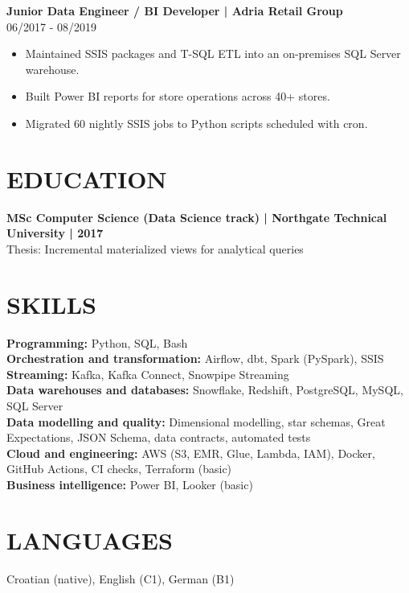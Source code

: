 \documentclass[11pt,a4paper]{article}
\newcommand{\cvsection}[1]{\section*{#1}}
\newcommand{\cvrole}[2]{\par\addvspace{0.5em}\noindent\textbf{#1}\\#2\par\nopagebreak}
\begin{document}
\cvrole{Junior Data Engineer / BI Developer | Adria Retail Group}{06/2017 - 08/2019}
\begin{itemize}
\item Maintained SSIS packages and T-SQL ETL into an on-premises SQL Server warehouse.
\item Built Power BI reports for store operations across 40+ stores.
\item Migrated 60 nightly SSIS jobs to Python scripts scheduled with cron.
\end{itemize}

\cvsection{EDUCATION}
\textbf{MSc Computer Science (Data Science track) | Northgate Technical University | 2017}\\
Thesis: Incremental materialized views for analytical queries

\cvsection{SKILLS}
\textbf{Programming:} Python, SQL, Bash\\
\textbf{Orchestration and transformation:} Airflow, dbt, Spark (PySpark), SSIS\\
\textbf{Streaming:} Kafka, Kafka Connect, Snowpipe Streaming\\
\textbf{Data warehouses and databases:} Snowflake, Redshift, PostgreSQL, MySQL, SQL Server\\
\textbf{Data modelling and quality:} Dimensional modelling, star schemas, Great Expectations, JSON Schema, data contracts, automated tests\\
\textbf{Cloud and engineering:} AWS (S3, EMR, Glue, Lambda, IAM), Docker, GitHub Actions, CI checks, Terraform (basic)\\
\textbf{Business intelligence:} Power BI, Looker (basic)

\cvsection{LANGUAGES}
Croatian (native), English (C1), German (B1)
\end{document}
